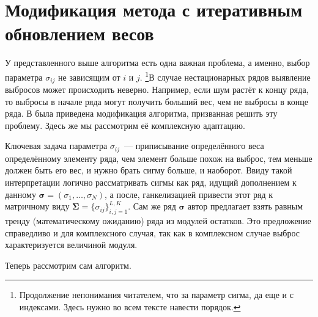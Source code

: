 \documentclass[specialist,
               substylefile = spbu.rtx,
               subf,href,colorlinks=true, 12pt]{disser}
\begin{document}
\section{Модификация метода с итеративным обновлением весов}

У представленного выше алгоритма есть одна важная проблема, а именно, выбор параметра $\sigma_{ij}$ не зависящим от $i$ и $j$. \footnote{Продолжение непонимания читателем, что за параметр сигма, да еще и с индексами. Здесь нужно во всем тексте навести порядок.}В случае нестационарных рядов выявление выбросов может происходить неверно. Например, если шум растёт к концу ряда, то выбросы в начале ряда могут получить больший вес, чем не выбросы в конце ряда. В \cite{Tretyakova20} была приведена модификация алгоритма, призванная решить эту проблему. Здесь же мы рассмотрим её комплексную адаптацию.

Ключевая задача параметра $\sigma_{ij}$~--- приписывание определённого веса определённому элементу ряда, чем элемент больше похож на выброс, тем меньше должен быть его вес, и нужно брать сигму больше, и наоборот. Ввиду такой интерпретации логично рассматривать сигмы как ряд, идущий дополнением к данному $\bm{\sigma} = (\sigma_1,\ldots,\sigma_N)$, а после, ганкелизацией привести этот ряд к матричному виду $\mathbf{\Sigma}=\{\sigma_{ij}\}_{i,j=1}^{L,K}$. Сам же ряд $\bm{\sigma}$ автор \cite{Tretyakova20} предлагает взять равным тренду (математическому ожиданию) ряда из модулей остатков. Это предложение справедливо и для комплексного случая, так как в комплексном случае выброс характеризуется величиной модуля.

Теперь рассмотрим сам алгоритм.
\end{document}
